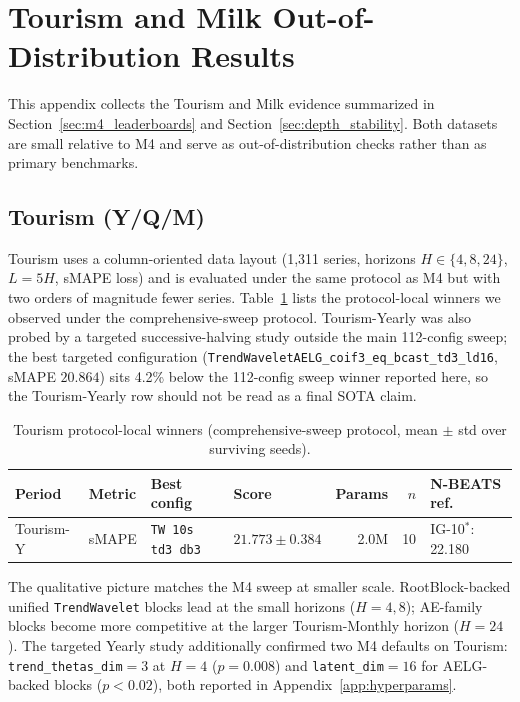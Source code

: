 \documentclass[11pt,a4paper]{article}
\begin{document}
\section{Tourism and Milk Out-of-Distribution Results}
\label{app:ood}

This appendix collects the Tourism and Milk evidence summarized in Section~\ref{sec:m4_leaderboards} and Section~\ref{sec:depth_stability}. Both datasets are small relative to M4 and serve as out-of-distribution checks rather than as primary benchmarks.

\subsection{Tourism (Y/Q/M)}

Tourism uses a column-oriented data layout (1{,}311 series, horizons $H \in \{4, 8, 24\}$, $L = 5H$, sMAPE loss) and is evaluated under the same protocol as M4 but with two orders of magnitude fewer series. Table~\ref{tab:tourism_winners} lists the protocol-local winners we observed under the comprehensive-sweep protocol. Tourism-Yearly was also probed by a targeted successive-halving study outside the main 112-config sweep; the best targeted configuration (\texttt{TrendWaveletAELG\_coif3\_eq\_bcast\_td3\_ld16}, sMAPE $20.864$) sits 4.2\% below the 112-config sweep winner reported here, so the Tourism-Yearly row should not be read as a final SOTA claim.

\begin{table}[h]
  \caption{Tourism protocol-local winners (comprehensive-sweep protocol, mean $\pm$ std over surviving seeds).}
  \label{tab:tourism_winners}
  \centering
  \scriptsize
  \setlength{\tabcolsep}{3pt}
  \begin{tabular}{llllrrl}
    \toprule
    Period & Metric & Best config & Score & Params & $n$ & N-BEATS ref. \\
    \midrule
    Tourism-Y & sMAPE & \texttt{TW 10s td3 db3}    & $21.773 \pm 0.384$ & 2.0M & 10 & IG-10$^*$: 22.180 \\
    \bottomrule
  \end{tabular}
\end{table}

The qualitative picture matches the M4 sweep at smaller scale. RootBlock-backed unified \texttt{TrendWavelet} blocks lead at the small horizons ($H = 4, 8$); AE-family blocks become more competitive at the larger Tourism-Monthly horizon ($H = 24$). The targeted Yearly study additionally confirmed two M4 defaults on Tourism: \texttt{trend\_thetas\_dim}$=3$ at $H=4$ ($p=0.008$) and \texttt{latent\_dim}$=16$ for AELG-backed blocks ($p<0.02$), both reported in Appendix~\ref{app:hyperparams}.
\end{document}
